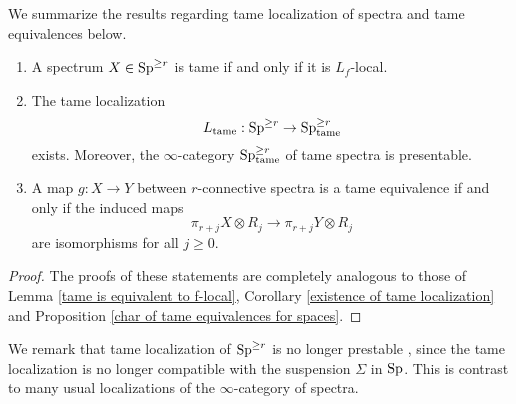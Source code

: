 We
summarize the results regarding tame localization of spectra and tame equivalences below. 

\begin{proposition}
        \begin{enumerate}
            \item A spectrum $X\in \operatorname{Sp}^{\geq r}$ is tame if and only if it is $L_f$-local.
            \item The tame localization
$$
L_{\operatorname{\operatorname{tame}}}: \operatorname{Sp}^{\geq r} \to \operatorname{Sp}^{\geq r}_{\operatorname{\operatorname{tame}}}
$$
exists. Moreover, the $\infty$-category $\operatorname{Sp}^{\geq r}_{\operatorname{\operatorname{tame}}}$ of tame spectra is presentable.
\item  A map $g: X\to Y$ between $r$-connective spectra is a tame equivalence if and only if the induced maps
        $$
        \pi_{r+j}X \otimes R_{j} 
        \to
        \pi_{r+j}Y \otimes R_{j}
        $$
        are isomorphisms for all $j\geq 0$.
        \end{enumerate}
\end{proposition}
\begin{proof}
    The proofs of these statements are completely analogous to those of Lemma \ref{tame is equivalent to f-local}, Corollary \ref{existence of tame localization} and Proposition \ref{char of tame equivalences for spaces}.
    
\end{proof}

\begin{remark}
We remark that tame localization of $\operatorname{Sp}^{\geq r}$ is no longer prestable \cite[Definition C.1.2.1.]{SAG}, since the tame localization is no longer compatible with the suspension $\Sigma$ in $\operatorname{Sp}$.
This is contrast to many usual localizations of the $\infty$-category of spectra.
\end{remark}



